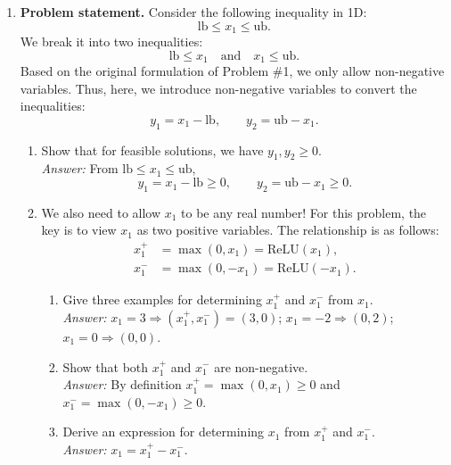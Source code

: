 \documentclass[11pt]{article}
\begin{document}
\begin{enumerate}[label=\textbf{2(\alph*)}]
	\item \textbf{Problem statement.}  
	Consider the following inequality in 1D:
	\begin{equation}
		\text{lb} \leq x_1 \leq \text{ub}.
		\label{eq:ineq1d}
	\end{equation}
	We break it into two inequalities:
	\[
	\text{lb} \leq x_1 \quad \text{and} \quad x_1 \leq \text{ub}.
	\]
	Based on the original formulation of Problem \#1, we only allow non-negative
	variables. Thus, here, we introduce non-negative variables to convert the inequalities:
	\[
	y_1 = x_1 - \text{lb}, \qquad y_2 = \text{ub} - x_1.
	\]
	\begin{enumerate}[label=\roman*)]
		\item Show that for feasible solutions, we have $y_1, y_2 \geq 0$.\\
		\emph{Answer:} From $\text{lb}\le x_1\le \text{ub}$,
		\[
		y_1=x_1-\text{lb}\ge 0,\qquad y_2=\text{ub}-x_1\ge 0.
		\]
		
		\item We also need to allow $x_1$ to be any real number! For this problem, the
		key is to view $x_1$ as two positive variables. The relationship is as follows:
		\begin{align}
			x_1^{+} &= \max(0, x_1) = \mathrm{ReLU}(x_1), \label{eq:relu_pos} \\
			x_1^{-} &= \max(0, -x_1) = \mathrm{ReLU}(-x_1). \label{eq:relu_neg}
		\end{align}
		\begin{enumerate}[label=\Alph*.]
			\item Give three examples for determining $x_1^{+}$ and $x_1^{-}$ from $x_1$.\\
			\emph{Answer:} $x_1=3\Rightarrow(x_1^+,x_1^-)=(3,0)$; $x_1=-2\Rightarrow(0,2)$; $x_1=0\Rightarrow(0,0)$.
			\item Show that both $x_1^{+}$ and $x_1^{-}$ are non-negative.\\
			\emph{Answer:} By definition $x_1^+=\max(0,x_1)\ge 0$ and $x_1^-=\max(0,-x_1)\ge 0$.
			\item Derive an expression for determining $x_1$ from $x_1^{+}$ and $x_1^{-}$.\\
			\emph{Answer:} $x_1=x_1^+-x_1^-$.
		\end{enumerate}
		

\end{enumerate}
\end{enumerate}
\end{document}
